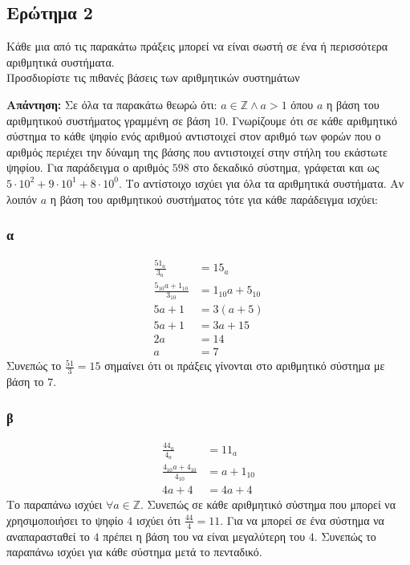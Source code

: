 \documentclass[draft]{article}
\begin{document}
\subsection{Ερώτημα 2}
Κάθε μια από τις παρακάτω πράξεις μπορεί να είναι σωστή σε ένα ή περισσότερα αριθμητικά συστήματα. \\
Προσδιορίστε τις πιθανές βάσεις των αριθμητικών συστημάτων 

\textbf{Απάντηση: }
Σε όλα τα παρακάτω θεωρώ ότι: $a \in \mathbb{Z} \land a > 1$ όπου $a$ η βάση του αριθμητικού συστήματος γραμμένη σε βάση $10$.
Γνωρίζουμε ότι σε κάθε αριθμητικό σύστημα το κάθε ψηφίο ενός αριθμού αντιστοιχεί στον αριθμό των φορών που ο αριθμός περιέχει την δύναμη της βάσης που αντιστοιχεί στην στήλη του εκάστωτε ψηφίου.
Για παράδειγμα ο αριθμός $598$ στο δεκαδικό σύστημα, γράφεται και ως $5 \cdot 10^2 + 9 \cdot 10^1 + 8 \cdot 10^0$. Το αντίστοιχο ισχύει για όλα τα αριθμητικά συστήματα.
Αν λοιπόν $a$ η βάση του αριθμητικού συστήματος τότε για κάθε παράδειγμα ισχύει:
\subsubsection{α}
\begin{align*}
  \frac{51_a}{3_a} &= 15_a \\
  \frac{5_{10}a + 1_{10}}{3_{10}} &= 1_{10}a + 5_{10} \\
  5a + 1 &= 3(a + 5) \\
  5a + 1 &= 3a + 15 \\
  2a &= 14 \\
  a &= 7
\end{align*}
Συνεπώς το $\frac{51}{3} = 15$ σημαίνει ότι οι πράξεις γίνονται στο αριθμητικό σύστημα με βάση το $7$.

\subsubsection{β}
\begin{align*}
  \frac{44_a}{4_a} &= 11_a\\ 
  \frac{4_{10}a + 4_{10}}{4_{10}} &= a + 1_{10}\\
  4a + 4 &= 4a + 4
\end{align*}
Το παραπάνω ισχύει $\forall a \in \mathbb{Z}$. Συνεπώς σε κάθε αριθμητικό σύστημα που μπορεί να χρησιμοποιήσει το ψηφίο $4$ ισχύει ότι $\frac{44}{4} = 11$.
Για να μπορεί σε ένα σύστημα να αναπαρασταθεί το $4$ πρέπει η βάση του να είναι μεγαλύτερη του $4$. Συνεπώς το παραπάνω ισχύει για κάθε σύστημα μετά το πενταδικό.
\end{document}
